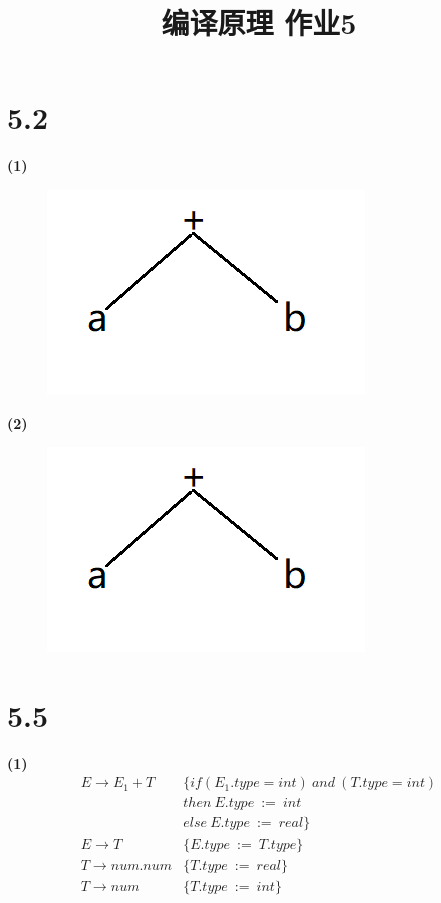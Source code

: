 \documentclass{article}
\title{编译原理 作业5}
\author{}
\date{}
\begin{document}
\section*{5.2}
\noindent

\textbf{(1)}
\begin{figure}[htbp]
\centering
\includegraphics[scale=0.7]{5_1.png}
\end{figure} 

\textbf{(2)}
\begin{figure}[htbp]
\centering
\includegraphics[scale=0.7]{5_1.png}
\end{figure} 

\section*{5.5}
\noindent

\textbf{(1)}
\begin{align*}
    E\rightarrow E_1+T\ \ \ \ &\{if(E_1.type=int)\ and\ (T.type=int)\\
&then\ E.type\ :=\ int\\
&else\ E.type\ :=\ real\}\\
E\rightarrow T\ \ \ \ \ \ \ \ \ \ \ \ &\{E.type\ :=\ T.type\}\\
T\rightarrow num.num&\{T.type\ :=\ real\}\\
T\rightarrow num\ \ \ \ \ \ \ \ &\{T.type\ :=\ int\}
\end{align*}
\end{document}
